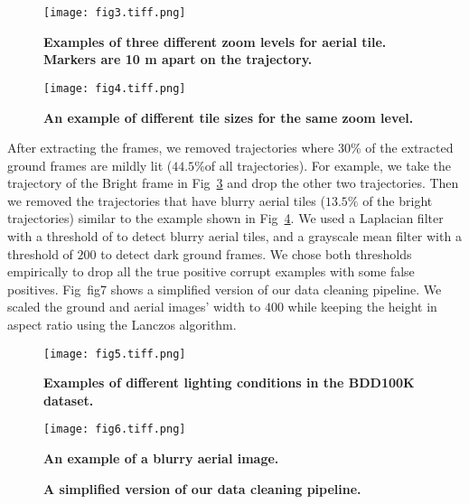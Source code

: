 \documentclass[10pt,letterpaper]{article}
\begin{document}
\begin{figure}[!h]
  \caption{{\bf Examples of three different zoom levels for aerial tile. Markers are 10 m apart on the trajectory.}}
  \texttt{[image: fig3.tiff.png]}
  \label{fig3}
\end{figure}

\begin{figure}[!h]
  \caption{{\bf An example of different tile sizes for the same zoom level.}}
  \texttt{[image: fig4.tiff.png]}
  \label{fig4}
\end{figure}

After extracting the frames, we removed trajectories where 30\% of the extracted ground frames are mildly lit ($44.5\%$of all trajectories). For example, we take the trajectory of the Bright frame in Fig~\ref{fig5} and drop the other two trajectories. Then we removed the trajectories that have blurry aerial tiles ($13.5\%$ of the bright trajectories) similar to the example shown in Fig~\ref{fig6}. We used a Laplacian filter~\cite{bib11} with a threshold of  to detect blurry aerial tiles, and a grayscale mean filter with a threshold of $200$ to detect dark ground frames. We chose both thresholds empirically to drop all the true positive corrupt examples with some false positives. Fig~{fig7} shows a simplified version of our data cleaning pipeline. We scaled the ground and aerial images’ width to $400$ while keeping the height in aspect ratio using the Lanczos algorithm.

\begin{figure}[!h]
  \caption{{\bf Examples of different lighting conditions in the BDD100K dataset.}}
  \texttt{[image: fig5.tiff.png]}
  \label{fig5}
\end{figure}

\begin{figure}[!h]
  \caption{{\bf An example of a blurry aerial image.}}
  \texttt{[image: fig6.tiff.png]}
  \label{fig6}
\end{figure}

\begin{figure}[!h]
  \caption{{\bf A simplified version of our data cleaning pipeline.}}
  \label{fig7}
\end{figure}
\FloatBarrier
\end{document}
